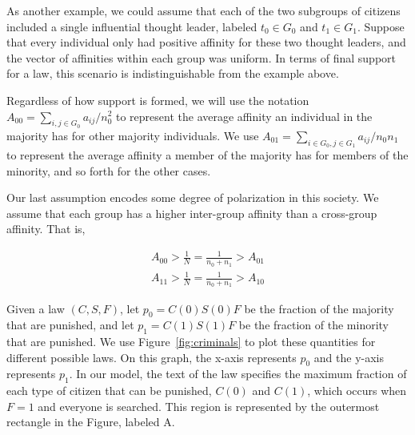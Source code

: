 As another example, we could assume that each of the two subgroups of citizens included a single influential thought leader, labeled $t_0 \in G_0$ and $t_1 \in G_1$.  Suppose that every individual only had positive affinity for these two thought leaders, and the vector of affinities within each group was uniform.  In terms of final support for a law, this scenario is indistinguishable from the example above.


Regardless of how support is formed, we will use the notation $A_{00} = \sum_{i,j \in G_0} a_{ij} / n_0^2$ to represent the average affinity an individual in the majority has for other majority individuals.  We use $A_{01} = \sum_{i \in G_0, j \in G_1} a_{ij} / n_0 n_1$ to represent the average affinity a member of the majority has for members of the minority, and so forth for the other cases.

Our last assumption encodes some degree of polarization in this society.  We assume that each group has a higher inter-group affinity than a cross-group affinity.  That is, 

\begin{align} 
A_{00} > \frac{1}{N}=\frac{1}{n_0+n_1} > A_{01} \\
A_{11} > \frac{1}{N}=\frac{1}{n_0+n_1}>  A_{10}
\end{align}

Given a law $(C, S, F)$, let $p_0 = C(0)S(0)F$ be the fraction of the majority that are punished, and let $p_1 = C(1)S(1)F$ be the fraction of the minority that are punished.  We use Figure~\ref{fig:criminals} to plot these quantities for different possible laws.  On this graph, the x-axis represents $p_0$ and the y-axis represents $p_1$.  In our model, the text of the law specifies the maximum fraction of each type of citizen that can be punished, $C(0)$ and $C(1)$, which occurs when $F=1$ and everyone is searched.  This region is represented by the outermost rectangle in the Figure, labeled A.



